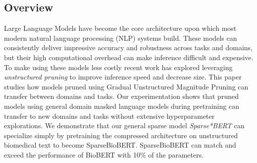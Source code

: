 \subsection{Overview}
Large Language Models have become the core architecture upon which most modern natural language processing (NLP) systems build. These models can consistently deliver impressive accuracy and robustness across tasks and domains, but their high computational overhead can make inference difficult and expensive. To make using these models less costly recent work has explored leveraging \textit{unstructured pruning} to improve inference speed and decrease size. This paper studies how models pruned using Gradual Unstructured Magnitude Pruning can transfer between domains and tasks. Our experimentation shows that pruned models using general domain masked language models during pretraining can transfer to new domains and tasks without extensive hyperparameter explorations. We demonstrate that our general sparse model \textit{Sparse*BERT} can specialize simply by pretraining the compressed architecture on unstructured biomedical text to become SparseBioBERT. SparseBioBERT can match and exceed the performance of BioBERT with 10\% of the parameters.
